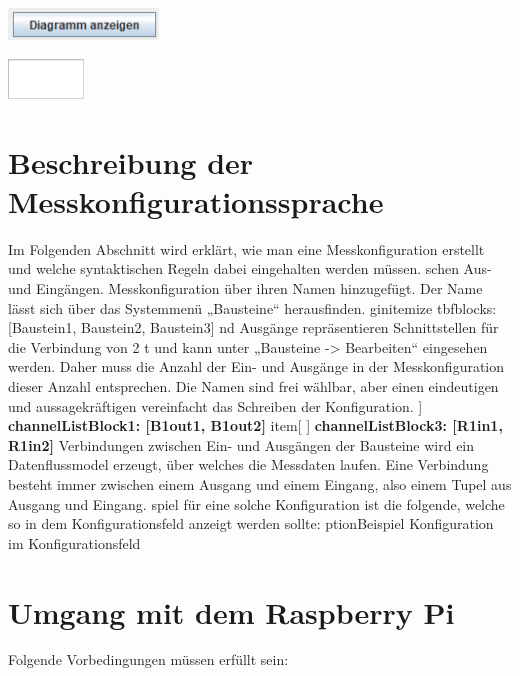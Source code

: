 \documentclass[parskip=full]{scrartcl}
\begin{document}
\begin{flushleft}
    \includegraphics[width = 4cm]{Grafiken/13-Diagramm_anzeigen.png}
\end{flushleft}

\begin{flushleft}
    \includegraphics[width = 2cm]{Grafiken/14-Datenanzeige.png}
\end{flushleft}

\section{Beschreibung der Messkonfigurationssprache}


Im Folgenden Abschnitt wird erklärt, wie man eine Messkonfiguration erstellt und welche syntaktischen Regeln dabei eingehalten werden müssen.  
schen Aus- und Eingängen.  
 Messkonfiguration über ihren Namen hinzugefügt. Der Name lässt sich über das Systemmenü „Bausteine“ herausfinden.   
gin{itemize}
tbf{blocks: [Baustein1, Baustein2, Baustein3]}
nd Ausgänge repräsentieren Schnittstellen für die Verbindung von 2  
t und kann unter „Bausteine -> Bearbeiten“ eingesehen werden. Daher muss die Anzahl der Ein- und Ausgänge in der Messkonfiguration dieser Anzahl entsprechen. Die Namen sind frei wählbar, aber einen eindeutigen und aussagekräftigen vereinfacht das Schreiben der Konfiguration.  
 ] \textbf{channelListBlock1: [B1out1, B1out2]}
item[ ] \textbf{channelListBlock3: [R1in1, R1in2]} 
 Verbindungen zwischen Ein- und Ausgängen der Bausteine wird ein Datenflussmodel erzeugt, über welches die Messdaten laufen.  Eine Verbindung besteht immer zwischen einem Ausgang und einem Eingang, also einem Tupel aus Ausgang und Eingang.   
spiel für eine solche Konfiguration ist die folgende, welche so in dem Konfigurationsfeld anzeigt werden sollte:
ption{Beispiel Konfiguration im Konfigurationsfeld}


\clearpage
\section{Umgang mit dem Raspberry Pi}

Folgende Vorbedingungen müssen erfüllt sein:
\end{document}
